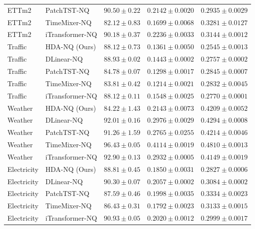 \begin{table}[t]
\begin{tabular*}{\textwidth}{@{\extracolsep{\fill}}llrrr@{}}
ETTm2 & PatchTST-NQ & $90.50\pm0.22$ & $0.2142\pm0.0020$ & $0.2935\pm0.0029$ \\
ETTm2 & TimeMixer-NQ & $82.12\pm0.83$ & $0.1699\pm0.0068$ & $0.3281\pm0.0127$ \\
ETTm2 & iTransformer-NQ & $\boldsymbol{90.18\pm0.37}$ & $0.2236\pm0.0033$ & $0.3144\pm0.0012$ \\
Traffic & HDA-NQ (Ours) & $88.12\pm0.73$ & $0.1361\pm0.0050$ & $\boldsymbol{0.2545\pm0.0013}$ \\
Traffic & DLinear-NQ & $\boldsymbol{88.93\pm0.02}$ & $0.1443\pm0.0002$ & $0.2757\pm0.0002$ \\
Traffic & PatchTST-NQ & $84.78\pm0.07$ & $0.1298\pm0.0017$ & $0.2845\pm0.0007$ \\
Traffic & TimeMixer-NQ & $83.81\pm0.42$ & $0.1214\pm0.0021$ & $0.2832\pm0.0045$ \\
Traffic & iTransformer-NQ & $88.12\pm0.11$ & $0.1548\pm0.0025$ & $0.2770\pm0.0001$ \\
Weather & HDA-NQ (Ours) & $84.22\pm1.43$ & $0.2143\pm0.0073$ & $0.4209\pm0.0052$ \\
Weather & DLinear-NQ & $92.01\pm0.16$ & $0.2976\pm0.0029$ & $0.4294\pm0.0008$ \\
Weather & PatchTST-NQ & $\boldsymbol{91.26\pm1.59}$ & $0.2765\pm0.0255$ & $0.4214\pm0.0046$ \\
Weather & TimeMixer-NQ & $96.43\pm0.05$ & $0.4114\pm0.0019$ & $0.4810\pm0.0013$ \\
Weather & iTransformer-NQ & $92.90\pm0.13$ & $0.2932\pm0.0005$ & $\boldsymbol{0.4149\pm0.0019}$ \\
Electricity & HDA-NQ (Ours) & $88.81\pm0.45$ & $0.1850\pm0.0031$ & $\boldsymbol{0.2827\pm0.0006}$ \\
Electricity & DLinear-NQ & $\boldsymbol{90.30\pm0.07}$ & $0.2057\pm0.0002$ & $0.3084\pm0.0002$ \\
Electricity & PatchTST-NQ & $87.59\pm0.46$ & $0.1998\pm0.0035$ & $0.3334\pm0.0023$ \\
Electricity & TimeMixer-NQ & $86.43\pm0.31$ & $0.1792\pm0.0023$ & $0.3133\pm0.0015$ \\
Electricity & iTransformer-NQ & $90.93\pm0.05$ & $0.2020\pm0.0012$ & $0.2999\pm0.0017$ \\
\bottomrule
\end{tabular*}
\end{table}
